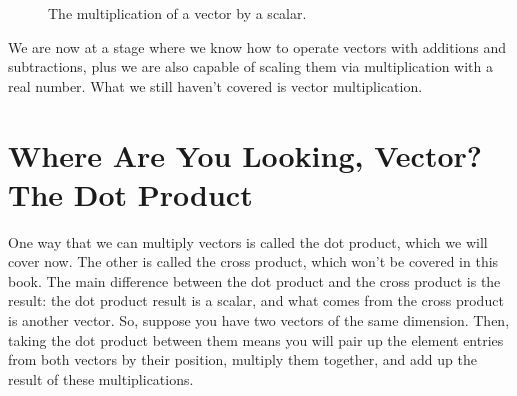 \documentclass[600paper, 11pt,twoside,openany]{kdp}
\begin{document}
\begin{figure}[h!]
\begin{center}
\vspace*{13pt}
\caption{The multiplication of a vector by a scalar.}\label{fig:vectorscalarexample}
\end{center}
\end{figure}
\indent We are now at a stage where we know how to operate vectors with additions and subtractions, plus we are also capable of scaling them via multiplication with a real number. What we still haven’t covered is vector multiplication.

\section{Where Are You Looking, Vector? The Dot Product}

\indent  One way that we can multiply vectors is called the dot product, which we will cover now. The other is called the cross product, which won’t be covered in this book. The main difference between the dot product and the cross product is the result: the dot product result is a scalar, and what comes from the cross product is another vector. So, suppose you have two vectors of the same dimension. Then, taking the dot product between them means you will pair up the element entries from both vectors by their position, multiply them together, and add up the result of these multiplications. 
\end{document}
